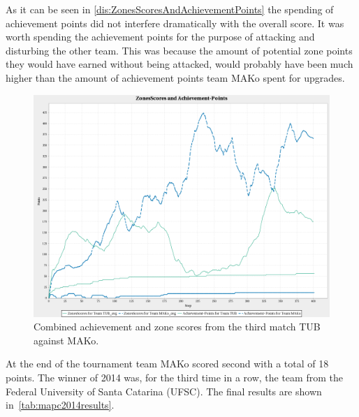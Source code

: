 As it can be seen in \autoref{dis:ZonesScoresAndAchievementPoints} the spending of achievement points did not interfere dramatically with the overall score.
It was worth spending the achievement points for the purpose of attacking and disturbing the other team.
This was because the amount of potential zone points they would have earned without being attacked, would probably have been much higher than the amount of achievement points team MAKo spent for upgrades.
\begin{figure}[h]
	\centering
	\includegraphics[width=\textwidth]{images/ZonesScoresAndAchievementPoints.png}
  \caption{Combined achievement and zone scores from the third match TUB against MAKo.}
	\label{dis:ZonesScoresAndAchievementPoints}
\end{figure}
At the end of the tournament team MAKo scored second with a total of 18 points.
The winner of 2014 was, for the third time in a row, the team from the Federal University of Santa Catarina (UFSC).
The final results are shown in~\autoref{tab:mapc2014results}.

